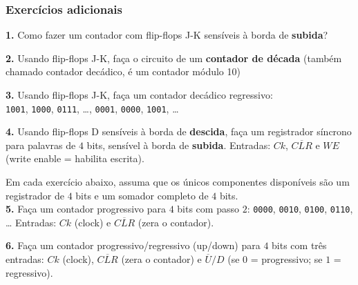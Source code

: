 \documentclass{beamer}
\newcommand{\Not}[1]{\overline{#1}}
\begin{document}
\begin{frame}
\frametitle{Exercícios adicionais}

{\small

\textbf{1.} Como fazer um contador com flip-flops J-K sensíveis
à borda de \textbf{subida}?\\[6pt]

\pause

\textbf{2.} Usando flip-flops J-K, faça o circuito de um
\textbf{contador de década} (também chamado contador decádico, é
um contador módulo 10)\\[6pt]

\pause

\textbf{3.} Usando flip-flops J-K, faça um contador decádico
regressivo:\\
\texttt{1001}, \texttt{1000}, \texttt{0111}, \ldots, \texttt{0001},
\texttt{0000}, \texttt{1001}, \ldots\\[6pt]

\pause

\textbf{4.} Usando flip-flops D sensíveis à borda de \textbf{descida},
faça um registrador síncrono para palavras de $4$ bits,
sensível à borda de \textbf{subida}. Entradas: $Ck$, $\Not{CLR}$ e
$WE$ (write enable = habilita escrita).\\[6pt]

\pause

Em cada exercício abaixo, assuma que os únicos componentes disponíveis
são um registrador de $4$ bits e um somador completo de $4$ bits.\\[6pt]

\textbf{5.} Faça um contador progressivo para $4$ bits com passo $2$:
\texttt{0000}, \texttt{0010}, \texttt{0100}, \texttt{0110}, \ldots
Entradas: $Ck$ (clock) e $\Not{CLR}$ (zera o contador).\\[6pt]

\pause

\textbf{6.} Faça um contador progressivo/regressivo (up/down) para $4$
bits com três entradas: $Ck$ (clock), $\Not{CLR}$ (zera o contador) e
$\Not{U}/D$ (se $0$ = progressivo; se $1$ = regressivo).

}

\end{frame}
\end{document}
